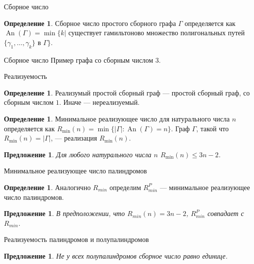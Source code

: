 \documentclass[14pt, aspectratio=169, notheorems]{beamer}
\theoremstyle{plain}
\newtheorem{proposition}[theorem]{Предложение}
\theoremstyle{definition}
\newtheorem{definition}[theorem]{Определение}
\theoremstyle{remark}
\newcommand{\An}{\operatorname{An}}
\begin{document}
\begin{frame}{Сборное число}
    \begin{definition}
    Сборное число простого сборного графа $\Gamma$ определяется как $\An(\Gamma) = \min\{k |$ существует гамильтоново множество полигональных путей $\{\gamma_1, \dots, \gamma_k\}$ в $\Gamma\}$.
\end{definition}
    \centering
    
\end{frame}

\begin{frame}{Сборное число}
Пример графа со сборным числом $3$.
    \centering
    
\end{frame}

\begin{frame}{Реализуемость}
\begin{definition}
    Реализумый простой сборный граф --- простой сборный граф, со сборным числом $1$. Иначе --- нереализуемый.
\end{definition}

\begin{definition}
    Минимальное реализующее число для натурального числа $n$ определяется как $R_{\min}(n) = \min\{|\Gamma|:\An(\Gamma) = n\}$. Граф $\Gamma$, такой что $R_{\min}(n) = |\Gamma|$, --- реализация $R_{\min}(n)$.
\end{definition}

\begin{proposition}
Для любого натурального числа $n$ $R_{\min}(n) \leq 3n - 2$.
\end{proposition}
\end{frame}

\begin{frame}{Минимальное реализующее число палиндромов}
\begin{definition}
    Аналогично $R_{min}$ определим $R_{min}^P$ --- минимальное реализующее число палиндромов.
\end{definition}    
\begin{proposition}
    В предположении, что $R_{min}(n) = 3n - 2$, $R_{min}^P$ совпадает с $R_{min}$.
\end{proposition}
\end{frame}

\begin{frame}{Реализуемость палиндромов и полупалиндромов}
    \begin{proposition}
    Не у всех полупалиндромов сборное число равно единице.
    \end{proposition}
    \centering
    
\end{frame}
\end{document}
